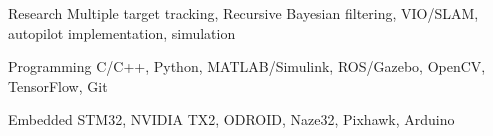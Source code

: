 

\begin{cvskills}

  \cvskill
    {Research} %
    {Multiple target tracking, Recursive Bayesian filtering, VIO/SLAM, autopilot implementation, simulation} %

  \cvskill
    {Programming} %
    {C/C++, Python, MATLAB/Simulink, ROS/Gazebo, OpenCV, TensorFlow, Git} %

  \cvskill
    {Embedded} %
    {STM32, NVIDIA TX2, ODROID, Naze32, Pixhawk, Arduino} %

\end{cvskills}
